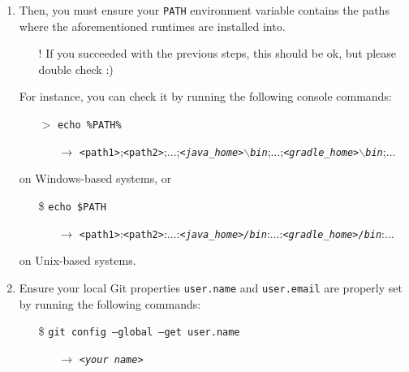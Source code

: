 \documentclass[handout]{beamer}\mode<presentation>{\usetheme{AMSCesenaBleu}}
\begin{document}
\begin{frame}[allowframebreaks]
\begin{enumerate}
   \item Then, you must ensure your \texttt{PATH} environment variable contains the paths  where the aforementioned runtimes are installed into. 
	\begin{itemize}
		\item[!] If you succeeded with the previous steps, this should be ok, but please double check :)
	\end{itemize}
    \vspace{.5cm}
    For instance, you can check it by running the following console commands:
    \begin{itemize}
        \item[$>$] \texttt{echo \alert{\%}PATH\alert{\%}}
        \begin{itemize}
            \item[$\rightarrow$] \texttt{<path1>}\alert{;}\texttt{<path2>}\alert{;}$\ldots$\alert{;}\textit{\texttt{<java\_home>$\backslash$bin}}\alert{;}$\ldots$\alert{;}\textit{\texttt{<gradle\_home>$\backslash$bin}}\alert{;}$\ldots$
        \end{itemize}
    \end{itemize}
    on Windows-based systems, or
    \begin{itemize}
        \item[\$] \texttt{echo \alert{\$}PATH}
        \begin{itemize}
            \item[$\rightarrow$] \texttt{<path1>}\alert{:}\texttt{<path2>}\alert{:}$\ldots$\alert{:}\textit{\texttt{<java\_home>/bin}}\alert{:}$\ldots$\alert{:}\textit{\texttt{<gradle\_home>/bin}}\alert{:}$\ldots$
        \end{itemize}
    \end{itemize}
    on Unix-based systems.
    
    \framebreak
    
    \item Ensure your local Git properties \alert{\texttt{user.name}} and \alert{\texttt{user.email}} are properly set by running the following commands:
    \begin{itemize}	
    	\item[\$] \texttt{git config --global --get user.\alert{name}}
    	\begin{itemize}	
    		\item[$\rightarrow$] \texttt{\textit{<your name>}}    		
    	\end{itemize}
    	

\end{itemize}
\end{enumerate}
\end{frame}
\end{document}
